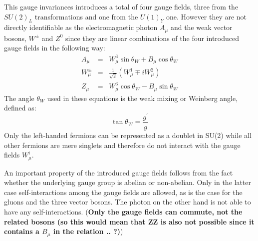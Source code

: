 \begin{myindentpar}
\begin{description}
    This gauge invariances introduces a total of four gauge fields, three from the $SU(2)_L$ transformations and one from the $U(1)_Y$ one.
    However they are not directly identifiable as the electromagnetic photon $A_{\mu}$ and the weak vector bosons, $W^{\pm}$ and $Z^{0}$ since they are linear combinations of the four introduced gauge fields in the following way:
    \begin{eqnarray}
     A_{\mu} & = & W_{\mu}^{3} \sin \theta_{W} + B_{\mu} \cos \theta_{W} \nonumber \\
     W_{\mu}^{\pm} & = & \frac{1}{\sqrt{2}} \left( W_{\mu}^{1} \mp i W_{\mu}^{2} \right) \label{eq::EWGaugeBosons} \\
     Z_{\mu} & = & W_{\mu}^{3} \cos \theta_{W} - B_{\mu} \sin \theta_{W} \nonumber
    \end{eqnarray}
    The angle $\theta_{W}$ used in these equations is the weak mixing or Weinberg angle, defined as:
    \begin{equation}
     \tan \theta_{W} = \frac{g^{'}}{g}
    \end{equation}
    Only the left-handed fermions can be represented as a doublet in SU(2) while all other fermions are mere singlets and therefore do not interact with the gauge fields $W_{\mu}^{i}$. 
   \end{description}
\end{myindentpar}

An important property of the introduced gauge fields follows from the fact whether the underlying gauge group is abelian or non-abelian. Only in the latter case self-interactions among the gauge fields are allowed, as is the case for the gluons and the three vector bosons. The photon on the other hand is not able to have any self-interactions. (\textbf{Only the gauge fields can commute, not the related bosons (so this would mean that ZZ is also not possible since it contains a $B_{\mu}$ in the relation .. ?)})

